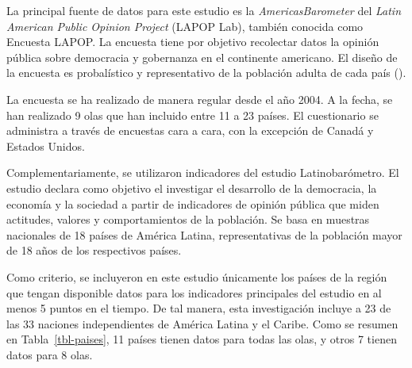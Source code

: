 \documentclass[
  letterpaper,
  DIV=11,
  numbers=noendperiod]{scrartcl}
\begin{document}
La principal fuente de datos para este estudio es la
\emph{AmericasBarometer} del \emph{Latin American Public Opinion
Project} (LAPOP Lab), también conocida como Encuesta LAPOP. La encuesta
tiene por objetivo recolectar datos la opinión pública sobre democracia
y gobernanza en el continente americano. El diseño de la encuesta es
probalístico y representativo de la población adulta de cada país
().

La encuesta se ha realizado de manera regular desde el año 2004. A la
fecha, se han realizado 9 olas que han incluido entre 11 a 23 países. El
cuestionario se administra a través de encuestas cara a cara, con la
excepción de Canadá y Estados Unidos.

Complementariamente, se utilizaron indicadores del estudio
Latinobarómetro. El estudio declara como objetivo el investigar el
desarrollo de la democracia, la economía y la sociedad a partir de
indicadores de opinión pública que miden actitudes, valores y
comportamientos de la población. Se basa en muestras nacionales de 18
países de América Latina, representativas de la población mayor de 18
años de los respectivos países.

Como criterio, se incluyeron en este estudio únicamente los países de la
región que tengan disponible datos para los indicadores principales del
estudio en al menos 5 puntos en el tiempo. De tal manera, esta
investigación incluye a 23 de las 33 naciones independientes de América
Latina y el Caribe. Como se resumen en Tabla~\ref{tbl-paises}, 11 países
tienen datos para todas las olas, y otros 7 tienen datos para 8 olas.
\end{document}
